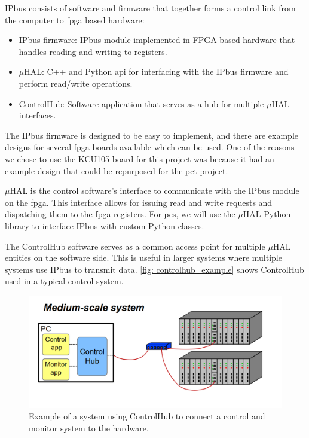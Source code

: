 \documentclass[main.tex]{subfiles}
\begin{document}
IPbus consists of software and firmware that together forms a control link from the computer to \gls{fpga} based hardware:

\begin{itemize}
    \item IPbus firmware: IPbus module implemented in FPGA based hardware that handles reading and writing to registers.
    \item $\mu$HAL: C++ and Python \gls{api} for interfacing with the IPbus firmware and perform read/write operations.
    \item ControlHub: Software application that serves as a hub for multiple $\mu$HAL interfaces.
\end{itemize}  

The IPbus firmware is designed to be easy to implement, and there are example designs for several \gls{fpga} boards available which can be used. One of the reasons we chose to use the KCU105 board for this project was because it had an example design that could be repurposed for the \gls{pct}-project.

$\mu$HAL is the control software's interface to communicate with the IPbus module on the \gls{fpga}. This interface allows for issuing read and write requests and dispatching them to the \gls{fpga} registers. For \gls{pcs}, we will use the $\mu$HAL Python library to interface IPbus with custom Python classes.

The ControlHub software serves as a common access point for multiple $\mu$HAL entities on the software side. This is useful in larger systems where multiple systems use IPbus to transmit data. \autoref{fig: controlhub_example} shows ControlHub used in a typical control system.

\begin{figure}[!htpb]
    \centering
    \includegraphics[scale=0.3]{images/controlhub_example.png}
    \caption{Example of a system using ControlHub to connect a control and monitor system to the hardware\cite{IPbus}.}
    \label{fig: controlhub_example}
\end{figure}
\FloatBarrier
\end{document}
